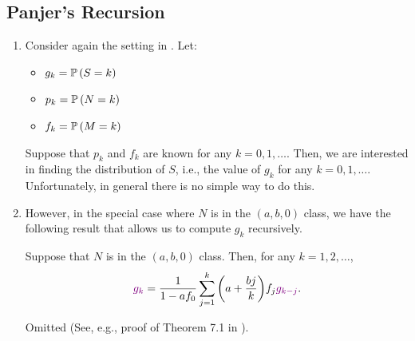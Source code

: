 \subsection{Panjer's Recursion}
\begin{enumerate}
\item Consider again the setting in . Let:
\begin{itemize}
\item \(g_k=\mathbb{P}\left(S=k\right)\)
\item \(p_k=\mathbb{P}\left(N=k\right)\)
\item \(f_k=\mathbb{P}\left(M=k\right)\)
\end{itemize}
Suppose that \(p_k\) and \(f_k\) are known for any \(k=0,1,\dotsc\). Then, we are
interested in finding the distribution of \(S\), i.e., the value of \(g_k\) for
any \(k=0,1,\dotsc\). Unfortunately, in general there is no simple way to do
this.

\item However, in the special case where \(N\) is in the \((a,b,0)\) class, we
have the following result that allows us to compute \(g_k\) recursively.
\begin{theorem}
\label{thm:panjer-recursion-ab0}
Suppose that \(N\) is in the \((a,b,0)\) class. Then, for any
\(k=1,2,\dotsc\),
\[
{\color{violet}g_k}=\frac{1}{1-af_0}\sum_{j=1}^{k}\qty(a+\frac{bj}{k})f_j{\color{violet}g_{k-j}}.
\]
\end{theorem}
\begin{pf}
Omitted (See, e.g., proof of Theorem 7.1 in \textcite{klugman2019loss}).
\end{pf}


\end{enumerate}
